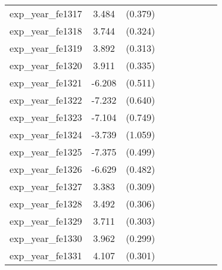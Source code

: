 {\begin{tabular}{l*{4}{cc}}
exp\_year\_fe1317&    3.484\sym{***}&  (0.379)&                  &         &                  &         &                  &         \\
exp\_year\_fe1318&    3.744\sym{***}&  (0.324)&                  &         &                  &         &                  &         \\
exp\_year\_fe1319&    3.892\sym{***}&  (0.313)&                  &         &                  &         &                  &         \\
exp\_year\_fe1320&    3.911\sym{***}&  (0.335)&                  &         &                  &         &                  &         \\
exp\_year\_fe1321&   -6.208\sym{***}&  (0.511)&                  &         &                  &         &                  &         \\
exp\_year\_fe1322&   -7.232\sym{***}&  (0.640)&                  &         &                  &         &                  &         \\
exp\_year\_fe1323&   -7.104\sym{***}&  (0.749)&                  &         &                  &         &                  &         \\
exp\_year\_fe1324&   -3.739\sym{***}&  (1.059)&                  &         &                  &         &                  &         \\
exp\_year\_fe1325&   -7.375\sym{***}&  (0.499)&                  &         &                  &         &                  &         \\
exp\_year\_fe1326&   -6.629\sym{***}&  (0.482)&                  &         &                  &         &                  &         \\
exp\_year\_fe1327&    3.383\sym{***}&  (0.309)&                  &         &                  &         &                  &         \\
exp\_year\_fe1328&    3.492\sym{***}&  (0.306)&                  &         &                  &         &                  &         \\
exp\_year\_fe1329&    3.711\sym{***}&  (0.303)&                  &         &                  &         &                  &         \\
exp\_year\_fe1330&    3.962\sym{***}&  (0.299)&                  &         &                  &         &                  &         \\
exp\_year\_fe1331&    4.107\sym{***}&  (0.301)&                  &         &                  &         &                  &         \\

\end{tabular}}
